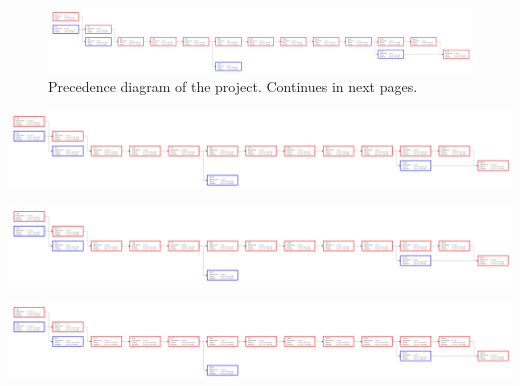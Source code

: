 \clearpage
\begin{figure}
	\centering
	\includegraphics[trim=0in 0in 26in 0in, clip, angle=90]{fig/precedence}
	\caption[Precedence diagram of the project.]{Precedence diagram of the project. Continues in
	next pages.}\label{fig:precedence}
\end{figure}
\clearpage

\begin{center}
	\includegraphics[trim=8.88in 0in 17in 0in, clip, angle=90]{fig/precedence}
	\clearpage

	\includegraphics[trim=17.88in 0in 8in 0in, clip, angle=90]{fig/precedence}
	\clearpage

	\includegraphics[trim=26.88in 0in 0in 0in, clip, angle=90]{fig/precedence}
\end{center}
\clearpage

